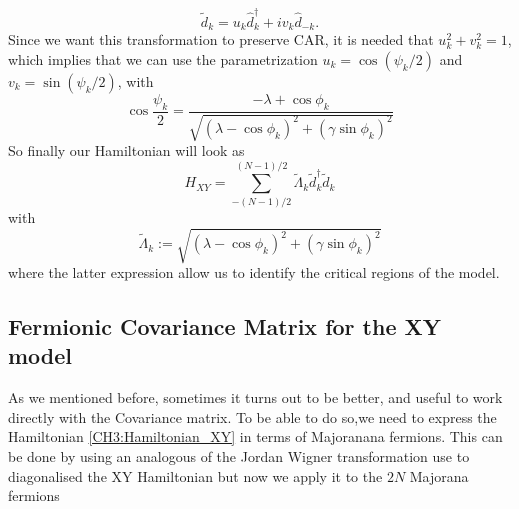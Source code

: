 \begin{equation}
\tilde{d}_{k}=u_{k} \hat{d}_{k}^{\dagger}+i v_{k} \hat{d}_{-k}.
\end{equation}
Since we want this transformation to preserve CAR, it is needed that $u_k^2 + v_k^2 = 1$, which implies that we can use the parametrization $u_{k}=\cos \left(\psi_{k} / 2\right)$ and $v_{k}=\sin \left(\psi_{k} / 2\right)$, with
\begin{equation}
\cos \frac{\psi_{k}}{2}=\frac{-\lambda+\cos \phi_{k}}{\sqrt{\left(\lambda-\cos \phi_{k}\right)^{2}+\left(\gamma \sin \phi_{k}\right)^{2}}}
\end{equation}
So finally our Hamiltonian will look as
\begin{equation}
H_{X Y}=\sum_{-(N-1) / 2}^{(N-1) / 2} \tilde{\Lambda}_{k} \tilde{d}_{k}^{\dagger} \tilde{d}_{k}
\end{equation}
with 
\begin{equation}
\tilde{\Lambda}_{k}:=\sqrt{\left(\lambda-\cos \phi_{k}\right)^{2}+\left(\gamma \sin \phi_{k}\right)^{2}}
\end{equation}
where the latter expression allow us to identify the critical regions of the model.
\subsection{Fermionic Covariance Matrix for the XY model}

As we mentioned before, sometimes it turns out to be better, and useful to work directly with the Covariance matrix. To be able to do so,we need to express the Hamiltonian \eqref{CH3:Hamiltonian_XY} in terms of Majoranana fermions. This can be done by using an analogous of the Jordan Wigner transformation use to diagonalised the XY Hamiltonian but now we apply it to the $2N$ Majorana fermions

